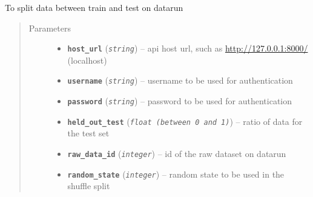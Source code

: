 \documentclass[letterpaper,10pt,english]{sphinxmanual}
\begin{document}

\begin{fulllineitems}
\label{modules/views:test_files.post_api.post_split}
To split data between train and test on datarun
\begin{quote}\begin{description}
\item[{Parameters}] \leavevmode\begin{itemize}
\item {} 
\textbf{\texttt{host\_url}} (\emph{\texttt{string}}) -- api host url, such as \url{http://127.0.0.1:8000/} (localhost)

\item {} 
\textbf{\texttt{username}} (\emph{\texttt{string}}) -- username to be used for authentication

\item {} 
\textbf{\texttt{password}} (\emph{\texttt{string}}) -- password to be used for authentication

\item {} 
\textbf{\texttt{held\_out\_test}} (\emph{\texttt{float (between 0 and 1)}}) -- ratio of data for the test set

\item {} 
\textbf{\texttt{raw\_data\_id}} (\emph{\texttt{integer}}) -- id of the raw dataset on datarun

\item {} 
\textbf{\texttt{random\_state}} (\emph{\texttt{integer}}) -- random state to be used in the shuffle split

\end{itemize}

\end{description}\end{quote}

\end{fulllineitems}

\end{document}
